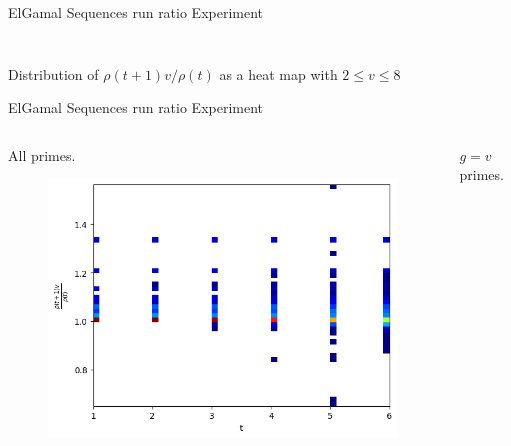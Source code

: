 \begin{frame}{ElGamal Sequences run ratio Experiment}
\begin{columns}
\begin{column}{0.45\textwidth}
\begin{figure}
            \end{figure}
        \end{column}
    \end{columns}
    \begin{center}
                Distribution of $\rho(t+1)v/\rho(t)$ as a heat map with $2 \leq v \leq 8$
    \end{center}
\end{frame}

\begin{frame}{ElGamal Sequences run ratio Experiment}
    \begin{columns}
        \begin{column}{0.45\textwidth}
        \begin{center}
            All primes.
        \end{center}
            \begin{figure}
                \centering
                \includegraphics[width=\textwidth]{figures/v2Normalizedrunratio.png}
            \end{figure}
        \end{column}
        \begin{column}{0.45\textwidth}
        \begin{center}
            $g = v$ primes.
        \end{center}
            \begin{figure}
                \centering

\end{figure}
\end{column}
\end{columns}
\end{frame}
